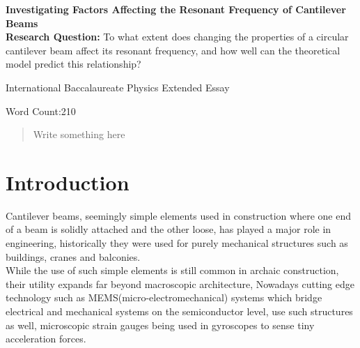 \documentclass[a4paper,12pt]{article}
\begin{document}
\begin{titlepage}
    \begin{center}
        \vspace*{1cm}

        \textbf{Investigating Factors Affecting the Resonant Frequency of Cantilever Beams}\\

        \vspace{.5cm}
        \textbf{Research Question:}
        To what extent does changing the properties of a circular cantilever beam affect its resonant frequency, and how well can the theoretical model predict this relationship?

        \vspace{0.5cm}
        International Baccalaureate Physics Extended Essay

        \vfill

        \vspace{0.8cm}

        Word Count:210


    \end{center}
\end{titlepage}


\tableofcontents
{}
\pagebreak

\begin{abstract}

    Write something here

\end{abstract}
\pagebreak


\section{Introduction}%

    Cantilever beams, seemingly simple elements used in construction where one end of a beam is solidly attached and the other loose, has played a major role in engineering, historically they were used for purely mechanical structures such as buildings, cranes and balconies.
    \autocite{BuildingConstructionBook}\\
    While the use of such simple elements is still common in archaic construction, their utility expands far beyond macroscopic architecture, Nowadays cutting edge technology such as MEMS(micro-electromechanical) systems which bridge electrical and mechanical systems on the semiconductor level, use such structures as well, microscopic strain gauges being used in gyroscopes to sense tiny acceleration forces.
    \autocite{MemsBook}%
\end{document}
